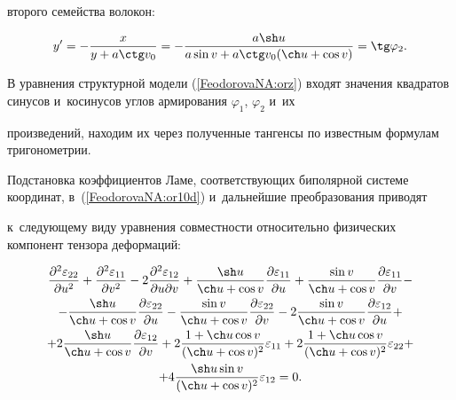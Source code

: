 второго семейства волокон:

\begin{eqnarray*}

y^{\prime}=-\frac{x}{y+a\ctg v_0}=-\frac{a\sh u}{a\sin v+a\ctg

v_0(\ch u+\cos v)}=\tg \varphi_2.

\end{eqnarray*}



В уравнения структурной модели (\ref{FeodorovaNA:orz}) входят значения квадратов синусов и~косинусов углов армирования $\varphi_1$, $\varphi_2$ и~их

произведений, находим их через полученные тангенсы по известным формулам тригонометрии. 

Подстановка коэффициентов Ламе, соответствующих биполярной системе координат, в~(\ref{FeodorovaNA:or10d}) и~дальнейшие преобразования приводят 

к~следующему виду уравнения совместности относительно физических компонент тензора деформаций:

\begin{multline}

\label{FeodorovaNA:or11}

\frac{\partial^2\varepsilon_{22}}{\partial u^2}+

\frac{\partial^2\varepsilon_{11}}{\partial v^2}-

2\frac{\partial^2\varepsilon_{12}}{\partial u\partial v}+

\frac{\sh u}{\ch u+\cos v}\frac{\partial\varepsilon_{11}}{\partial u}+ 

\frac{\sin v}{\ch u+\cos v}\frac{\partial\varepsilon_{11}}{\partial v}-

\\

- \frac{\sh u}{\ch u+\cos v}\frac{\partial\varepsilon_{22}}{\partial u}-

\frac{\sin v}{\ch u+\cos v}\frac{\partial\varepsilon_{22}}{\partial v}-

2\frac{\sin v}{\ch u+\cos v}\frac{\partial\varepsilon_{12}}{\partial u}+\\

+2\frac{\sh u}{\ch u+\cos v}\frac{\partial\varepsilon_{12}}{\partial v}+ 

2\frac{1+\ch u\cos v}{(\ch u+\cos v)^2}\varepsilon_{11}+

2\frac{1+\ch u\cos v}{(\ch u+\cos v)^2}\varepsilon_{22}+

\\

+4\frac{\sh u\sin v}{(\ch u+\cos v)^2}\varepsilon_{12}=0.

\end{multline}



